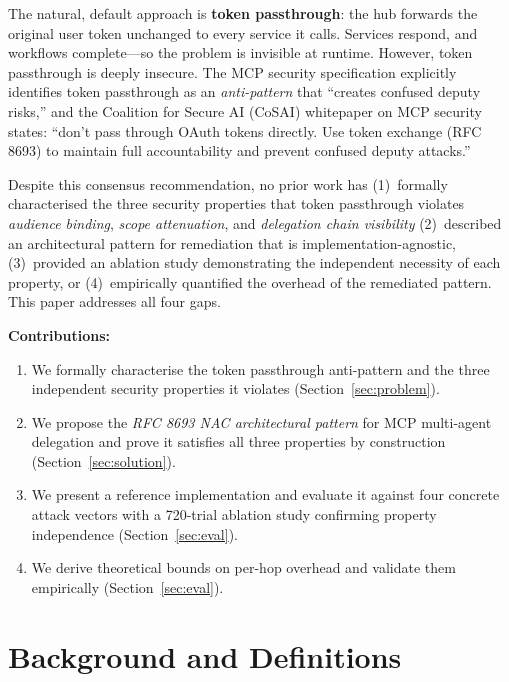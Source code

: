 \documentclass[journal]{IEEEtran}
\begin{document}
The natural, default approach is \textbf{token passthrough}: the hub forwards
the original user token unchanged to every service it calls. Services respond,
and workflows complete---so the problem is invisible at runtime. However,
token passthrough is deeply insecure. The MCP security specification \cite{mcp_security} explicitly
identifies token passthrough as an \textit{anti-pattern} that ``creates confused
deputy risks,'' and the Coalition for Secure AI (CoSAI) whitepaper on MCP
security \cite{cosai_mcp} states: ``don't pass through OAuth tokens directly.
Use token exchange (RFC 8693) to maintain full accountability and prevent confused
deputy attacks.''

Despite this consensus recommendation, no prior work has (1)~formally
characterised the three security properties that token passthrough
violates \textit{audience binding}, \textit{scope attenuation}, and
\textit{delegation chain visibility} (2)~described an architectural pattern for
remediation that is implementation-agnostic, (3)~provided an ablation study
demonstrating the independent necessity of each property, or (4)~empirically
quantified the overhead of the remediated pattern. This paper addresses all four
gaps.

\textbf{Contributions:}
\begin{enumerate}
  \item We formally characterise the token passthrough anti-pattern and the three
        independent security properties it violates
        (Section~\ref{sec:problem}).
  \item We propose the \textit{RFC 8693 NAC architectural pattern} for MCP
        multi-agent delegation and prove it satisfies all three properties by
        construction (Section~\ref{sec:solution}).
  \item We present a reference implementation and evaluate it against four
        concrete attack vectors with a 720-trial ablation study confirming
        property independence (Section~\ref{sec:eval}).
  \item We derive theoretical bounds on per-hop overhead and validate them
        empirically (Section~\ref{sec:eval}).
\end{enumerate}

\section{Background and Definitions}
\label{sec:background}
\end{document}
